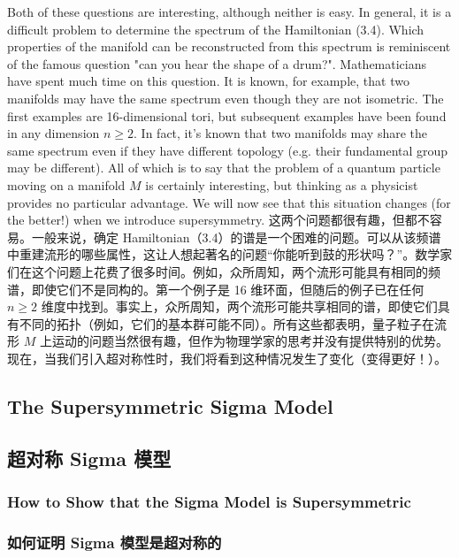 \documentclass{article}
\begin{document}
\begin{paracol}{2}
Both of these questions are interesting, although neither is easy. In general, it is a diﬃcult problem to determine the spectrum of the Hamiltonian (3.4). Which properties of the manifold can be reconstructed from this spectrum is reminiscent of the famous question "can you hear the shape of a drum?". Mathematicians have spent much time on this question. It is known, for example, that two manifolds may have the same spectrum even though they are not isometric. The first examples are 16-dimensional tori, but subsequent examples have been found in any dimension $n \geq 2$. In fact, it’s known that two manifolds may share the same spectrum even if they have different topology (e.g. their fundamental group may be different). All of which is to say that the problem of a quantum particle moving on a manifold $M$ is certainly interesting, but thinking as a physicist provides no particular advantage. We will now see that this situation changes (for the better!) when we introduce supersymmetry.
\switchcolumn
这两个问题都很有趣，但都不容易。一般来说，确定 Hamiltonian（3.4）的谱是一个困难的问题。可以从该频谱中重建流形的哪些属性，这让人想起著名的问题“你能听到鼓的形状吗？”。数学家们在这个问题上花费了很多时间。例如，众所周知，两个流形可能具有相同的频谱，即使它们不是同构的。第一个例子是 16 维环面，但随后的例子已在任何 $n \geq 2$ 维度中找到。事实上，众所周知，两个流形可能共享相同的谱，即使它们具有不同的拓扑（例如，它们的基本群可能不同）。所有这些都表明，量子粒子在流形 $M$ 上运动的问题当然很有趣，但作为物理学家的思考并没有提供特别的优势。现在，当我们引入超对称性时，我们将看到这种情况发生了变化（变得更好！）。
\switchcolumn*

\subsection{The Supersymmetric Sigma Model}
\switchcolumn
\subsection*{超对称 Sigma 模型}
\switchcolumn*

\subsubsection{How to Show that the Sigma Model is Supersymmetric}
\switchcolumn
\subsubsection*{如何证明 Sigma 模型是超对称的}
\switchcolumn*


\end{paracol}
\end{document}
